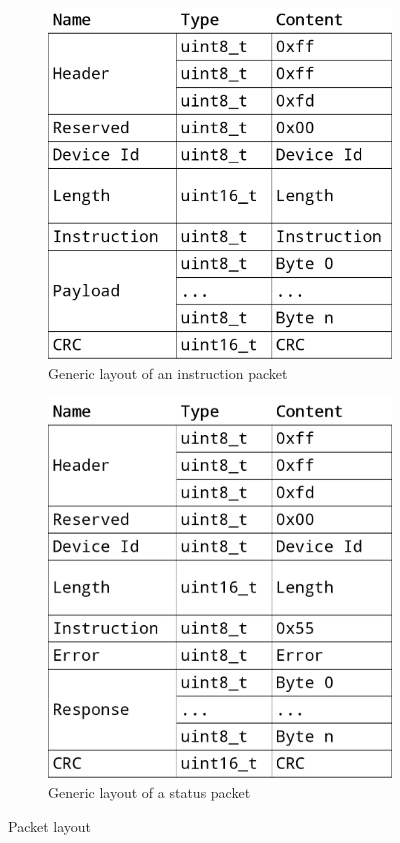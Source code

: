\begin{figure}[h]
    \centering

    \begin{subfigure}[t]{0.5\textwidth}
        \centering
        \includegraphics[scale=0.19]{img/packet.png}
        \caption{Generic layout of an instruction packet}
    \end{subfigure}%
    \begin{subfigure}[t]{0.5\textwidth}
        \centering
        \includegraphics[scale=0.19]{img/status_packet.png}
        \caption{Generic layout of a status packet}
    \end{subfigure}

    \caption{Packet layout}
\end{figure}

